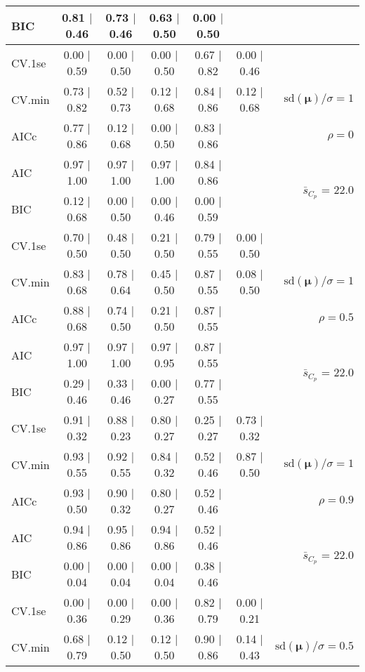 \documentclass[12pt]{article}
\newcommand{\mr}[1]{\mathrm{#1}}
\newcommand{\bm}[1]{\mathbf{#1}}
\begin{document}
\begin{table}[p]
\begin{center}
\begin{tabular}{l*{5}{c}|r}
BIC & 0.81 $\mid$ 0.46 & 0.73 $\mid$ 0.46 & 0.63 $\mid$ 0.50 & 0.00 $\mid$ 0.50 & & \\
 \hline 
CV.1se & 0.00 $\mid$ 0.59 & 0.00 $\mid$ 0.50 & 0.00 $\mid$ 0.50 & 0.67 $\mid$ 0.82 & 0.00 $\mid$ 0.46 &\\
CV.min & 0.73 $\mid$ 0.82 & 0.52 $\mid$ 0.73 & 0.12 $\mid$ 0.68 & 0.84 $\mid$ 0.86 & 0.12 $\mid$ 0.68 &  $\mr{sd}(\bm{\mu})/\sigma=1$ \\
AICc & 0.77 $\mid$ 0.86 & 0.12 $\mid$ 0.68 & 0.00 $\mid$ 0.50 & 0.83 $\mid$ 0.86 & & $\rho=0$ \\
AIC & 0.97 $\mid$ 1.00 & 0.97 $\mid$ 1.00 & 0.97 $\mid$ 1.00 & 0.84 $\mid$ 0.86 & & \multirow{2}{*}{$\bar{s}_{C_p}$ = 22.0} \\
BIC & 0.12 $\mid$ 0.68 & 0.00 $\mid$ 0.50 & 0.00 $\mid$ 0.46 & 0.00 $\mid$ 0.59 & & \\
 \hline 
CV.1se & 0.70 $\mid$ 0.50 & 0.48 $\mid$ 0.50 & 0.21 $\mid$ 0.50 & 0.79 $\mid$ 0.55 & 0.00 $\mid$ 0.50 &\\
CV.min & 0.83 $\mid$ 0.68 & 0.78 $\mid$ 0.64 & 0.45 $\mid$ 0.50 & 0.87 $\mid$ 0.55 & 0.08 $\mid$ 0.50 &  $\mr{sd}(\bm{\mu})/\sigma=1$ \\
AICc & 0.88 $\mid$ 0.68 & 0.74 $\mid$ 0.50 & 0.21 $\mid$ 0.50 & 0.87 $\mid$ 0.55 & & $\rho=0.5$ \\
AIC & 0.97 $\mid$ 1.00 & 0.97 $\mid$ 1.00 & 0.97 $\mid$ 0.95 & 0.87 $\mid$ 0.55 & & \multirow{2}{*}{$\bar{s}_{C_p}$ = 22.0} \\
BIC & 0.29 $\mid$ 0.46 & 0.33 $\mid$ 0.46 & 0.00 $\mid$ 0.27 & 0.77 $\mid$ 0.55 & & \\
 \hline 
CV.1se & 0.91 $\mid$ 0.32 & 0.88 $\mid$ 0.23 & 0.80 $\mid$ 0.27 & 0.25 $\mid$ 0.27 & 0.73 $\mid$ 0.32 &\\
CV.min & 0.93 $\mid$ 0.55 & 0.92 $\mid$ 0.55 & 0.84 $\mid$ 0.32 & 0.52 $\mid$ 0.46 & 0.87 $\mid$ 0.50 &  $\mr{sd}(\bm{\mu})/\sigma=1$ \\
AICc & 0.93 $\mid$ 0.50 & 0.90 $\mid$ 0.32 & 0.80 $\mid$ 0.27 & 0.52 $\mid$ 0.46 & & $\rho=0.9$ \\
AIC & 0.94 $\mid$ 0.86 & 0.95 $\mid$ 0.86 & 0.94 $\mid$ 0.86 & 0.52 $\mid$ 0.46 & & \multirow{2}{*}{$\bar{s}_{C_p}$ = 22.0} \\
BIC & 0.00 $\mid$ 0.04 & 0.00 $\mid$ 0.04 & 0.00 $\mid$ 0.04 & 0.38 $\mid$ 0.46 & & \\
 \hline 
CV.1se & 0.00 $\mid$ 0.36 & 0.00 $\mid$ 0.29 & 0.00 $\mid$ 0.36 & 0.82 $\mid$ 0.79 & 0.00 $\mid$ 0.21 &\\
CV.min & 0.68 $\mid$ 0.79 & 0.12 $\mid$ 0.50 & 0.12 $\mid$ 0.50 & 0.90 $\mid$ 0.86 & 0.14 $\mid$ 0.43 &  $\mr{sd}(\bm{\mu})/\sigma=0.5$ \\

\end{tabular}
\end{center}
\end{table}
\end{document}
